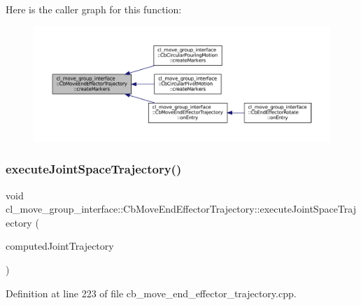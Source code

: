 Here is the caller graph for this function\+:
\nopagebreak
\begin{figure}[H]
\begin{center}
\leavevmode
\includegraphics[width=350pt]{classcl__move__group__interface_1_1CbMoveEndEffectorTrajectory_a442efa1d5bc9e9a16f74ecd31b13d9b5_icgraph}
\end{center}
\end{figure}
\mbox{\label{classcl__move__group__interface_1_1CbMoveEndEffectorTrajectory_a3a75fa185c62591e1869427650338a32}} 
\subsubsection{\texorpdfstring{execute\+Joint\+Space\+Trajectory()}{executeJointSpaceTrajectory()}}
{\footnotesize\ttfamily void cl\+\_\+move\+\_\+group\+\_\+interface\+::\+Cb\+Move\+End\+Effector\+Trajectory\+::execute\+Joint\+Space\+Trajectory (\begin{DoxyParamCaption}\item[{const moveit\+\_\+msgs\+::\+Robot\+Trajectory \&}]{computed\+Joint\+Trajectory }\end{DoxyParamCaption})\hspace{0.3cm}{\ttfamily [protected]}}



Definition at line 223 of file cb\+\_\+move\+\_\+end\+\_\+effector\+\_\+trajectory.\+cpp.



